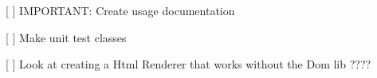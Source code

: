 
\begin{DoxyItemize}
\item \mbox{[} \mbox{]} I\+M\+P\+O\+R\+T\+A\+N\+T\+: Create usage documentation
\item \mbox{[} \mbox{]} Make unit test classes
\item \mbox{[} \mbox{]} Look at creating a Html Renderer that works without the Dom lib ???? 
\end{DoxyItemize}